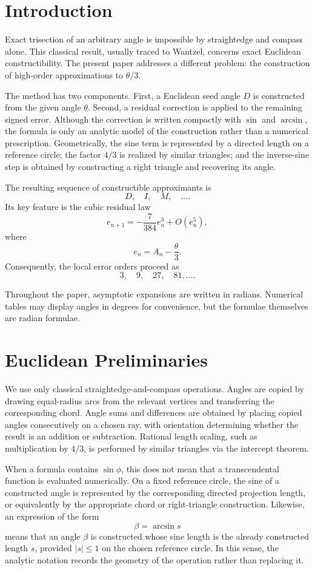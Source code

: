 \documentclass[11pt]{article}
\theoremstyle{remark}
\begin{document}
\section{Introduction}

Exact trisection of an arbitrary angle is impossible by straightedge and compass alone. This classical result, usually traced to Wantzel, concerns exact Euclidean constructibility. The present paper addresses a different problem: the construction of high-order approximations to \(\theta/3\).

The method has two components. First, a Euclidean seed angle \(D\) is constructed from the given angle \(\theta\). Second, a residual correction is applied to the remaining signed error. Although the correction is written compactly with \(\sin\) and \(\arcsin\), the formula is only an analytic model of the construction rather than a numerical prescription. Geometrically, the sine term is represented by a directed length on a reference circle; the factor \(4/3\) is realized by similar triangles; and the inverse-sine step is obtained by constructing a right triangle and recovering its angle.

The resulting sequence of constructible approximants is
\[
D,\quad I,\quad M,\quad \ldots.
\]
Its key feature is the cubic residual law
\[
e_{n+1}
=
-\frac{7}{384}e_n^3+O(e_n^5),
\]
where
\[
e_n=A_n-\frac{\theta}{3}.
\]
Consequently, the local error orders proceed as
\[
3,\quad 9,\quad 27,\quad 81,\ldots .
\]

Throughout the paper, asymptotic expansions are written in radians. Numerical tables may display angles in degrees for convenience, but the formulae themselves are radian formulae.

\section{Euclidean Preliminaries}
\label{sec:euclidean-preliminaries}

We use only classical straightedge-and-compass operations. Angles are copied by drawing equal-radius arcs from the relevant vertices and transferring the corresponding chord. Angle sums and differences are obtained by placing copied angles consecutively on a chosen ray, with orientation determining whether the result is an addition or subtraction. Rational length scaling, such as multiplication by \(4/3\), is performed by similar triangles via the intercept theorem.

When a formula contains \(\sin \phi\), this does not mean that a transcendental function is evaluated numerically. On a fixed reference circle, the sine of a constructed angle is represented by the corresponding directed projection length, or equivalently by the appropriate chord or right-triangle construction. Likewise, an expression of the form
\[
\beta=\arcsin s
\]
means that an angle \(\beta\) is constructed whose sine length is the already constructed length \(s\), provided \(|s|\le 1\) on the chosen reference circle. In this sense, the analytic notation records the geometry of the operation rather than replacing it.
\end{document}
